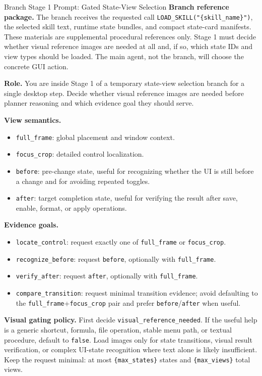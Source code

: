 \begin{promptbox}{Branch Stage 1 Prompt: Gated State-View Selection}
\textbf{Branch reference package.} The branch receives the requested call \texttt{LOAD\_SKILL("\{skill\_name\}")}, the selected skill text, runtime state bundles, and compact state-card manifests. These materials are supplemental procedural references only. Stage 1 must decide whether visual reference images are needed at all and, if so, which state IDs and view types should be loaded. The main agent, not the branch, will choose the concrete GUI action.

\medskip
\textbf{Role.} You are inside Stage 1 of a temporary state-view selection branch for a single desktop step. Decide whether visual reference images are needed before planner reasoning and which evidence goal they should serve.

\medskip
\textbf{View semantics.}
\begin{itemize}[leftmargin=*, itemsep=0.2em]
    \item \texttt{full\_frame}: global placement and window context.
    \item \texttt{focus\_crop}: detailed control localization.
    \item \texttt{before}: pre-change state, useful for recognizing whether the UI is still before a change and for avoiding repeated toggles.
    \item \texttt{after}: target completion state, useful for verifying the result after save, enable, format, or apply operations.
\end{itemize}

\textbf{Evidence goals.}
\begin{itemize}[leftmargin=*, itemsep=0.2em]
    \item \texttt{locate\_control}: request exactly one of \texttt{full\_frame} or \texttt{focus\_crop}.
    \item \texttt{recognize\_before}: request \texttt{before}, optionally with \texttt{full\_frame}.
    \item \texttt{verify\_after}: request \texttt{after}, optionally with \texttt{full\_frame}.
    \item \texttt{compare\_transition}: request minimal transition evidence; avoid defaulting to the \texttt{full\_frame}+\texttt{focus\_crop} pair and prefer \texttt{before}/\texttt{after} when useful.
\end{itemize}

\textbf{Visual gating policy.} First decide \texttt{visual\_reference\_needed}. If the useful help is a generic shortcut, formula, file operation, stable menu path, or textual procedure, default to \texttt{false}. Load images only for state transitions, visual result verification, or complex UI-state recognition where text alone is likely insufficient. Keep the request minimal: at most \texttt{\{max\_states\}} states and \texttt{\{max\_views\}} total views.


\end{promptbox}
